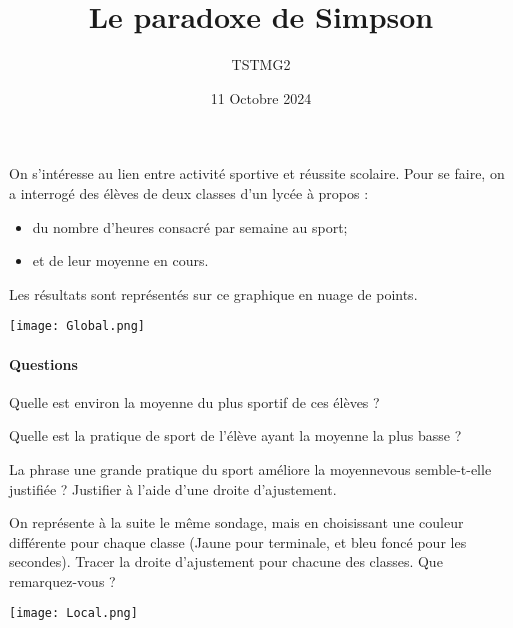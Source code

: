\documentclass{article}
\title{Le paradoxe de Simpson}
\date{11 Octobre 2024}
\author{TSTMG2}
\begin{document}
\maketitle

On s'intéresse au lien entre activité sportive et réussite scolaire. Pour se faire, on a interrogé des élèves de deux classes d'un lycée à propos :
\begin{itemize}
\item du nombre d'heures consacré par semaine au sport;
\item et de leur moyenne en cours.  
\end{itemize}
Les résultats sont représentés sur ce graphique en nuage de points.
\begin{center}
\texttt{[image: Global.png]}
\end{center}
\paragraph{Questions}
\begin{enumquestions}
\item Quelle est environ la moyenne du plus sportif de ces élèves ?
\item Quelle est la pratique de sport de l'élève ayant la moyenne la plus basse ?
\item La phrase \og une grande pratique du sport améliore la moyenne\fg vous semble-t-elle justifiée ? Justifier à l'aide d'une droite d'ajustement.
\item On représente à la suite le même sondage, mais en choisissant une couleur différente pour chaque classe (Jaune pour terminale, et bleu foncé pour les secondes). Tracer la droite d'ajustement pour chacune des classes. Que remarquez-vous ? 
\end{enumquestions}
\begin{center}
\texttt{[image: Local.png]}
\end{center}
\end{document}
